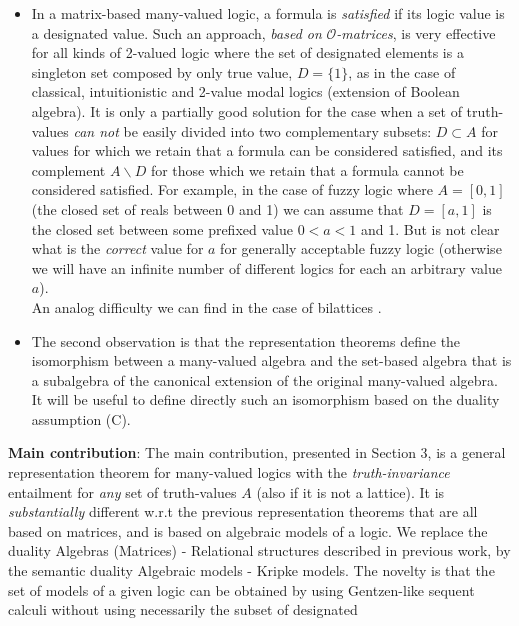 \documentclass[10pt,twocolumn]{article}
\renewcommand{\O}{\mathcal{O}} \renewcommand{\P}{\mathcal{P}}
\begin{document}
\begin{itemize}
  \item In a matrix-based many-valued logic, a formula is \emph{satisfied} if its logic value is a designated
  value.
  Such an approach, \emph{based on} $\O$\emph{-matrices}, is very effective for all kinds of 2-valued logic
  where the set of designated elements is a singleton set composed by only true value, $D =
  \{1\}$, as in the case of classical, intuitionistic and 2-value
  modal logics (extension of Boolean algebra). It is only a partially
  good  solution for the case when a set of truth-values \emph{can not} be
  easily divided into two complementary subsets: $D \subset A$ for
  values for which we retain that a formula can be considered
  satisfied, and its complement $A\backslash D$ for those which we retain that a formula cannot be considered satisfied. For example, in the case
  of fuzzy logic where $A = [0,1]$ (the closed set of reals between 0 and
  1)  we can assume that $D = [a, 1]$ is the closed set between
  some prefixed value $0 < a < 1$ and 1. But is not clear what is the \emph{correct} value for
  $a$ for generally acceptable fuzzy logic
(otherwise we will have an infinite number of different logics for each an arbitrary value $a$).\\
An analog difficulty we can find in the case of bilattices  \cite{Gins88,Fitt91,ArAv94,RuFa94,LaSa94,KSim01,Majk05Fu}.
\item  The
  second observation  is that the
  representation theorems define the
  isomorphism between a many-valued algebra and the
  set-based algebra that is a subalgebra of the canonical extension
  of the original many-valued algebra. It will be useful
  to define directly such an isomorphism based on the
  duality assumption (C).
\end{itemize}
 \textbf{Main contribution}: The main contribution, presented in
 Section 3, is a general representation theorem for many-valued logics
 with the \emph{truth-invariance} entailment for \emph{any} set of truth-values $A$ (also if it is not a lattice).
  It is \emph{substantially} different w.r.t the previous representation theorems that are all based on
 matrices, and is based on algebraic models of a logic. We
replace the duality Algebras (Matrices) - Relational structures
described in previous work, by the semantic duality Algebraic models
- Kripke models. The novelty is that the set of models of a given
logic can be obtained by using Gentzen-like sequent calculi
\cite{Majk09BS} without  using necessarily the subset of designated
\end{document}
